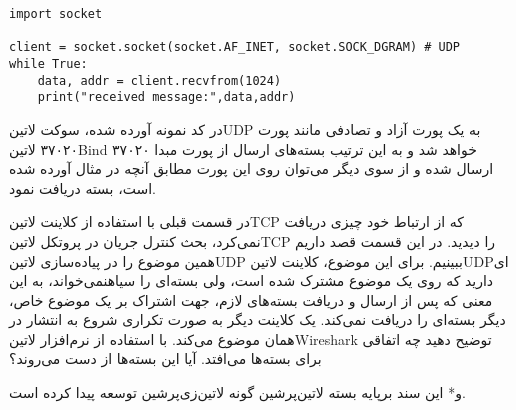 \documentclass[]{article}
\begin{document}
  \begin{latin}
  \begin{verbatim}
import socket

client = socket.socket(socket.AF_INET, socket.SOCK_DGRAM) # UDP
while True:
    data, addr = client.recvfrom(1024)
    print("received message:",data,addr)
  \end{verbatim}
  \end{latin}

  در کد نمونه آورده شده، سوکت ‌لاتین{UDP} به یک پورت آزاد و تصادفی مانند پورت ۳۷۰۲۰ ‌لاتین{Bind} خواهد شد و به این ترتیب بسته‌های ارسال از پورت مبدا ۳۷۰۲۰ ارسال شده
  و از سوی دیگر می‌توان روی این پورت مطابق آنچه در مثال آورده شده است، بسته دریافت نمود.


  در قسمت قبلی با استفاده از کلاینت ‌لاتین{TCP} که از ارتباط خود چیزی دریافت نمی‌کرد، بحث کنترل جریان
  در پروتکل ‌لاتین{TCP} را دیدید. در این قسمت قصد داریم همین موضوع را در پیاده‌سازی ‌لاتین{UDP} ببینیم.
  برای این موضوع، کلاینت ‌لاتین{UDP}ای دارید که روی یک موضوع مشترک شده است، ولی بسته‌ای را ‌سیاه{نمی‌خواند}،
  به این معنی که پس از ارسال و دریافت بسته‌های لازم، جهت اشتراک بر یک موضوع خاص، دیگر بسته‌ای را دریافت نمی‌کند.
  یک کلاینت دیگر به صورت تکراری شروع به انتشار در همان موضوع می‌کند.
  با استفاده از نرم‌افزار ‌لاتین{Wireshark} توضیح دهید چه اتفاقی برای بسته‌ها می‌افتد. آیا این بسته‌ها از دست می‌روند؟

  ‌و*{}
این سند برپایه بسته ‌لاتین{‌پرشین} گونه ‌لاتین{‌زی‌پرشین} توسعه پیدا کرده است.
\end{document}

